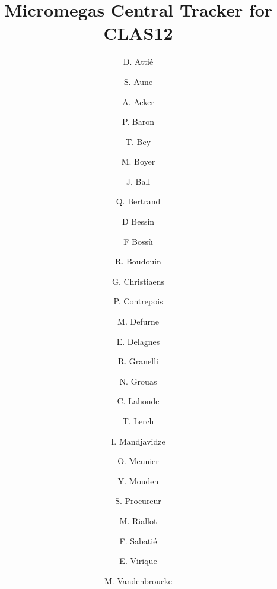 \title{Micromegas Central Tracker for CLAS12}

\author[A]{D. Atti\'e}
\author[A]{S. Aune}
\author[A]{A. Acker} 
\author[A]{P. Baron}
\author[A]{T. Bey}
\author[A]{M. Boyer}
\author[A]{J. Ball}
\author[A]{Q. Bertrand}
\author[A]{D Bessin}
\author[A]{F Boss\`u}
\author[A]{R. Boudouin}
\author[A]{G. Christiaens}
\author[A]{P. Contrepois}
\author[A]{M. Defurne}
\author[A]{E. Delagnes}
\author[A]{R. Granelli}
\author[A]{N. Grouas}
\author[A]{C. Lahonde}
\author[A]{T. Lerch}
\author[A]{I. Mandjavidze}
\author[A]{O. Meunier}
\author[A]{Y. Mouden}
\author[A]{S. Procureur}
\author[A]{M. Riallot}
\author[A]{F. Sabati\'e}
\author[A]{E. Virique}
\author[A]{M. Vandenbroucke}



\address[A]{CEA-Saclay, Gif-sur-Yvettes, France}
